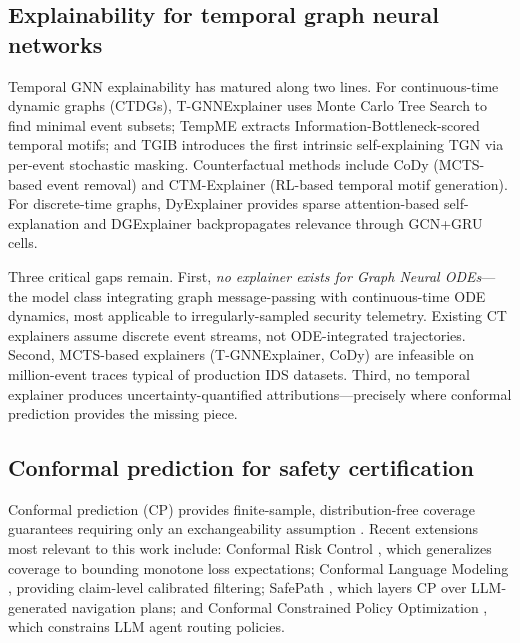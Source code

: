 \documentclass[preprint,review,12pt]{elsarticle}
\begin{document}
\subsection{Explainability for temporal graph neural networks}

Temporal GNN explainability has matured along two lines. For continuous-time dynamic graphs (CTDGs), T-GNNExplainer \cite{t_gnnexplainer_2023} uses Monte Carlo Tree Search to find minimal event subsets; TempME \cite{tempme_2024} extracts Information-Bottleneck-scored temporal motifs; and TGIB \cite{tgib_kdd_2024} introduces the first intrinsic self-explaining TGN via per-event stochastic masking. Counterfactual methods include CoDy \cite{cody_2025} (MCTS-based event removal) and CTM-Explainer \cite{ctm_explainer_2025} (RL-based temporal motif generation). For discrete-time graphs, DyExplainer \cite{dyexplainer_2025} provides sparse attention-based self-explanation and DGExplainer \cite{dgexplainer_ijcai_2025} backpropagates relevance through GCN+GRU cells.

Three critical gaps remain. First, \textit{no explainer exists for Graph Neural ODEs}---the model class integrating graph message-passing with continuous-time ODE dynamics, most applicable to irregularly-sampled security telemetry. Existing CT explainers assume discrete event streams, not ODE-integrated trajectories. Second, MCTS-based explainers (T-GNNExplainer, CoDy) are infeasible on million-event traces typical of production IDS datasets. Third, no temporal explainer produces uncertainty-quantified attributions---precisely where conformal prediction provides the missing piece.

\subsection{Conformal prediction for safety certification}

Conformal prediction (CP) provides finite-sample, distribution-free coverage guarantees requiring only an exchangeability assumption \cite{vovk_alrw_2022, angelopoulos_cp_gentle_2023}. Recent extensions most relevant to this work include: Conformal Risk Control \cite{angelopoulos_crc_2024}, which generalizes coverage to bounding monotone loss expectations; Conformal Language Modeling \cite{quach_clm_2024}, providing claim-level calibrated filtering; SafePath \cite{safepath_2025}, which layers CP over LLM-generated navigation plans; and Conformal Constrained Policy Optimization \cite{conformal_cpo_2025}, which constrains LLM agent routing policies.
\end{document}
